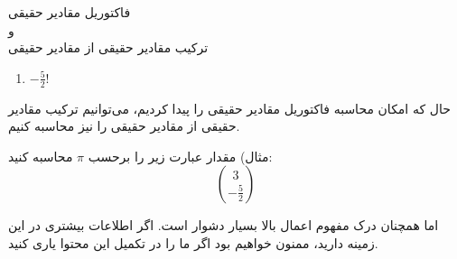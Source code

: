 \begin{extra}{
    فاکتوریل مقادیر حقیقی\\
    و\\
    ترکیب مقادیر حقیقی از مقادیر حقیقی
}
\begin{enumerate}
    \item 
    $-\frac{5}{2}!$
    
\end{enumerate}

حال که امکان محاسبه فاکتوریل مقادیر حقیقی را پیدا کردیم، می‌توانیم ترکیب مقادیر
حقیقی از مقادیر حقیقی را نیز محاسبه کنیم.

مثال)
مقدار عبارت زیر را برحسب $\pi$ محاسبه کنید:
$$3 \choose -\frac{5}{2}$$


اما همچنان درک مفهوم اعمال بالا بسیار دشوار است.
اگر اطلاعات بیشتری در این زمینه دارید، ممنون خواهیم بود اگر ما را در تکمیل این محتوا یاری کنید.
\end{extra}